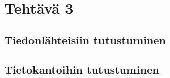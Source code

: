 \documentclass{article}
\author{Ville Kumpulainen}
\begin{document}
\section{Tehtävä 3}
\subsection{Tiedonlähteisiin tutustuminen}


\subsection{Tietokantoihin tutustuminen}

\end{document}
